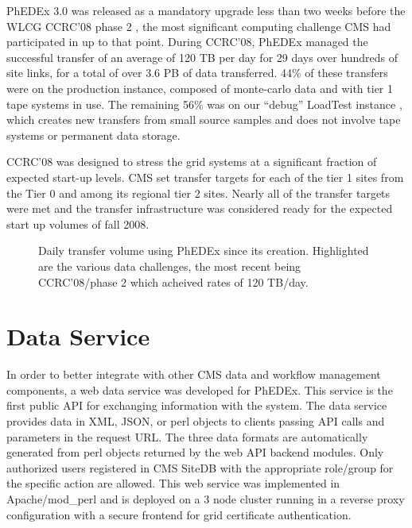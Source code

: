 \documentclass{PoS}
\begin{document}
PhEDEx 3.0 was released as a mandatory upgrade less than two weeks
before the WLCG CCRC'08 phase 2 \cite{ccrc08}, the most significant computing
challenge CMS had participated in up to that point.  During CCRC'08,
PhEDEx managed the successful transfer of an average of 120 TB per day
for 29 days over hundreds of site links, for a total of over 3.6 PB of
data transferred.  44\% of these transfers were on the production
instance, composed of monte-carlo data and with tier 1 tape systems in
use.  The remaining 56\% was on our ``debug'' LoadTest instance \cite{ddt-final}, which
creates new transfers from small source samples and does not involve
tape systems or permanent data storage.

CCRC'08 was designed to stress the grid systems at a significant
fraction of expected start-up levels.  CMS set transfer targets for
each of the tier 1 sites from the Tier 0 and among its regional tier 2
sites.  Nearly all of the transfer targets were met and the transfer
infrastructure was considered ready for the expected start up volumes
of fall 2008.

\begin{figure}[htp] 
\centering
\setlength\fboxsep{0pt} 
\setlength\fboxrule{0.5pt} 
\caption{Daily transfer volume using PhEDEx since its creation.
Highlighted are the various data challenges, the most recent being
CCRC'08/phase 2 which acheived rates of 120 TB/day.}
\label{fig:daily-volume}
\end{figure}

\section{Data Service}

In order to better integrate with other CMS data and workflow
management components, a web data service was developed for PhEDEx.
This service is the first public API for exchanging information with
the system.  The data service provides data in XML, JSON, or perl
objects to clients passing API calls and parameters in the request
URL.  The three data formats are automatically generated from perl
objects returned by the web API backend modules.  Only authorized
users registered in CMS SiteDB with the appropriate role/group for the
specific action are allowed.  This web service was implemented in
Apache/mod\_perl and is deployed on a 3 node cluster running in a
reverse proxy configuration with a secure frontend for grid
certificate authentication.
\end{document}
